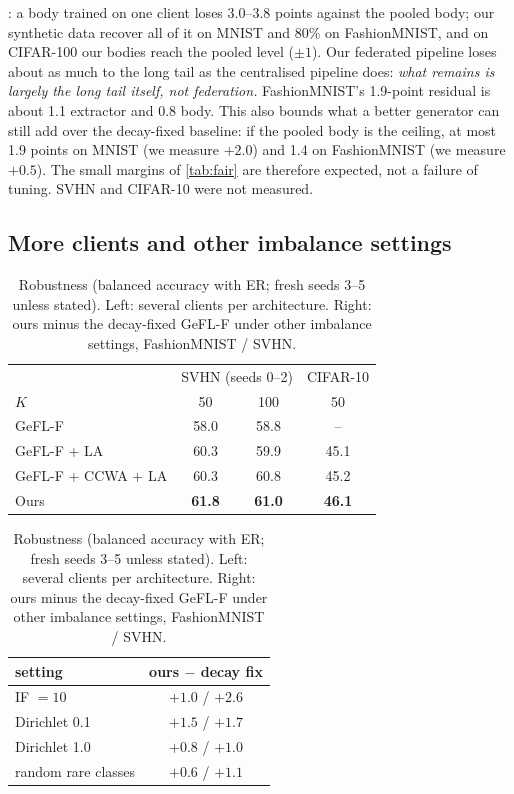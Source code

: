 \documentclass[10pt]{article}
\theoremstyle{plain}
\theoremstyle{definition}
\newcommand{\ER}{\textsc{ER}}
\newcommand{\pos}[1]{\textbf{#1}}
\begin{document}
: a body trained on one client loses 3.0--3.8 points against the pooled body; our synthetic data
recover all of it on MNIST and 80\% on FashionMNIST, and on CIFAR-100 our bodies reach the pooled level ($\pm1$). Our
federated pipeline loses about as much to the long tail as the centralised pipeline does: \emph{what remains is
largely the long tail itself, not federation.} FashionMNIST's 1.9-point residual is about 1.1 extractor and 0.8 body.
This also bounds what a better generator can still add over the decay-fixed baseline: if the pooled body is the ceiling, at most 1.9 points on
MNIST (we measure $+2.0$) and 1.4 on FashionMNIST (we measure $+0.5$). The small margins of \cref{tab:fair} are
therefore expected, not a failure of tuning. SVHN and CIFAR-10 were not measured.

\subsection{More clients and other imbalance settings}

\begin{table}[t]
\centering\small
\caption{Robustness (balanced accuracy with \ER; fresh seeds 3--5 unless stated). Left: several clients per
architecture. Right: ours minus the decay-fixed GeFL-F under other imbalance settings, FashionMNIST / SVHN.}
\label{tab:robust}
\setlength{\tabcolsep}{2.5pt}\footnotesize
\begin{tabular}{lccc}
\toprule
& \multicolumn{2}{c}{SVHN (seeds 0--2)} & CIFAR-10\\
$K$ & 50 & 100 & 50\\
\midrule
GeFL-F & 58.0 & 58.8 & --\\
GeFL-F + LA & 60.3 & 59.9 & 45.1\\
GeFL-F + CCWA + LA & 60.3 & 60.8 & 45.2\\
Ours & \pos{61.8} & \pos{61.0} & \pos{46.1}\\
\bottomrule
\end{tabular}\hfill
\begin{tabular}{lc}
\toprule
setting & ours $-$ decay fix\\
\midrule
IF $=10$ & $+1.0$ / $+2.6$\\
Dirichlet 0.1 & $+1.5$ / $+1.7$\\
Dirichlet 1.0 & $+0.8$ / $+1.0$\\
random rare classes & $+0.6$ / $+1.1$\\
\bottomrule
\end{tabular}
\end{table}
\end{document}
